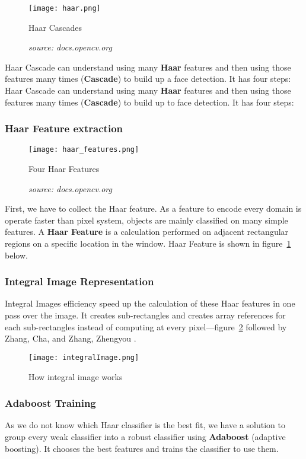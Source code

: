 \begin{figure}[H]
    \centering
    \texttt{[image: haar.png]}
    \caption{Haar Cascades}
    \caption*{\textit{source: docs.opencv.org}}
\end{figure}

Haar Cascade can understand using many \textbf{Haar} features and then using those features many times (\textbf{Cascade}) to build up a face detection. It has four steps: 
Haar Cascade can understand using many \textbf{Haar} features and then using those features many times (\textbf{Cascade}) to build up to face detection. It has four steps: 

\subsubsection{Haar Feature extraction}

\begin{figure}[H]
    \centering
    \texttt{[image: haar\_features.png]}
    \caption{Four Haar Features}
    \caption*{\textit{source: docs.opencv.org}}
    \label{fig:haarFeature}
\end{figure}

First, we have to collect the Haar feature. As a feature to encode every domain is operate faster than pixel system, objects are mainly classified on many simple features. A \textbf{Haar Feature} is a calculation performed on adjacent rectangular regions on a specific location in the window. Haar Feature is shown in figure~\ref{fig:haarFeature} below.

\subsubsection{Integral Image Representation}
Integral Images efficiency speed up the calculation of these Haar features in one pass over the image. It creates sub-rectangles and creates array references for each sub-rectangles instead of computing at every pixel—figure~\ref{fig:integralImage} followed by Zhang, Cha, and Zhang, Zhengyou \cite{book}.

\begin{figure}[H]
    \centering
    \texttt{[image: integralImage.png]}
    \caption{How integral image works}
    \label{fig:integralImage}
\end{figure}

\subsubsection{Adaboost Training}
As we do not know which Haar classifier is the best fit, we have a solution to group every weak classifier into a robust classifier using \textbf{Adaboost} (adaptive boosting). It chooses the best features and trains the classifier to use them. 

